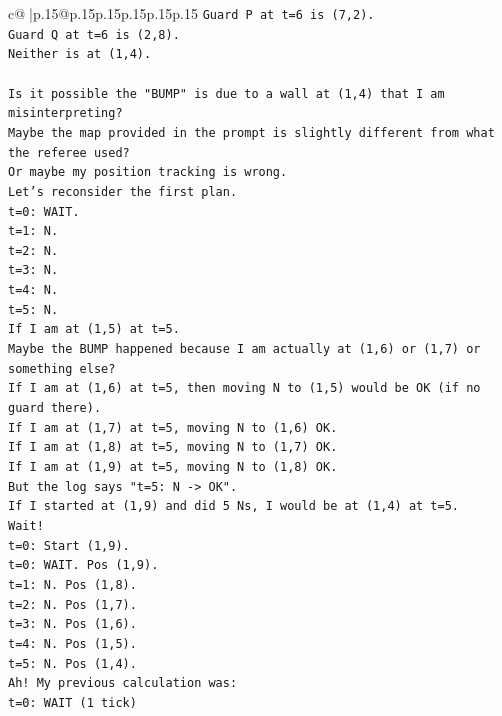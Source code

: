 \documentclass{article}
\begin{document}
{\begin{supertabular}{c@{$\;$}|p{.15\linewidth}@{}p{.15\linewidth}p{.15\linewidth}p{.15\linewidth}p{.15\linewidth}p{.15\linewidth}}
{{{\texttt{Guard P at t=6 is (7,2).} \\
\texttt{Guard Q at t=6 is (2,8).} \\
\texttt{Neither is at (1,4).} \\
\\ 
\texttt{Is it possible the "BUMP" is due to a wall at (1,4) that I am misinterpreting?} \\
\texttt{Maybe the map provided in the prompt is slightly different from what the referee used?} \\
\texttt{Or maybe my position tracking is wrong.} \\
\texttt{Let's reconsider the first plan.} \\
\texttt{t=0: WAIT.} \\
\texttt{t=1: N.} \\
\texttt{t=2: N.} \\
\texttt{t=3: N.} \\
\texttt{t=4: N.} \\
\texttt{t=5: N.} \\
\texttt{If I am at (1,5) at t=5.} \\
\texttt{Maybe the BUMP happened because I am actually at (1,6) or (1,7) or something else?} \\
\texttt{If I am at (1,6) at t=5, then moving N to (1,5) would be OK (if no guard there).} \\
\texttt{If I am at (1,7) at t=5, moving N to (1,6) OK.} \\
\texttt{If I am at (1,8) at t=5, moving N to (1,7) OK.} \\
\texttt{If I am at (1,9) at t=5, moving N to (1,8) OK.} \\
\texttt{But the log says "t=5: N {-}> OK".} \\
\texttt{If I started at (1,9) and did 5 Ns, I would be at (1,4) at t=5.} \\
\texttt{Wait!} \\
\texttt{t=0: Start (1,9).} \\
\texttt{t=0: WAIT. Pos (1,9).} \\
\texttt{t=1: N. Pos (1,8).} \\
\texttt{t=2: N. Pos (1,7).} \\
\texttt{t=3: N. Pos (1,6).} \\
\texttt{t=4: N. Pos (1,5).} \\
\texttt{t=5: N. Pos (1,4).} \\
\texttt{Ah! My previous calculation was:} \\
\texttt{t=0: WAIT (1 tick)} \\
}}}
\end{supertabular}}
\end{document}
